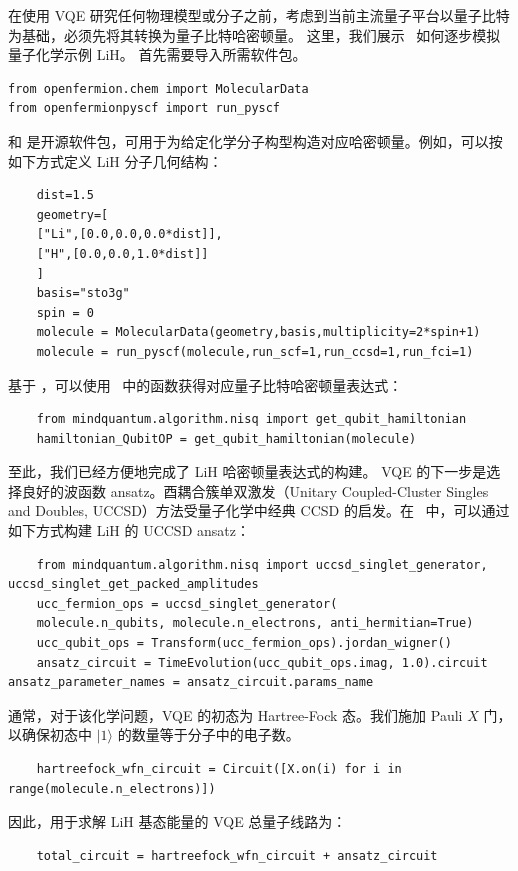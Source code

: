 在使用 VQE 研究任何物理模型或分子之前，考虑到当前主流量子平台以量子比特为基础，必须先将其转换为量子比特哈密顿量。
这里，我们展示 \MindQuantum\ 如何逐步模拟量子化学示例 LiH。
首先需要导入所需软件包。
\begin{lstlisting}
from openfermion.chem import MolecularData
from openfermionpyscf import run_pyscf
\end{lstlisting}
 和  是开源软件包，可用于为给定化学分子构型构造对应哈密顿量。例如，可以按如下方式定义 LiH 分子几何结构：
\begin{lstlisting}
    dist=1.5
    geometry=[
    ["Li",[0.0,0.0,0.0*dist]],
    ["H",[0.0,0.0,1.0*dist]]
    ]
    basis="sto3g"
    spin = 0
    molecule = MolecularData(geometry,basis,multiplicity=2*spin+1)
    molecule = run_pyscf(molecule,run_scf=1,run_ccsd=1,run_fci=1)
\end{lstlisting}
基于 ，可以使用 \MindQuantum\ 中的函数获得对应量子比特哈密顿量表达式：
\begin{lstlisting}
    from mindquantum.algorithm.nisq import get_qubit_hamiltonian
    hamiltonian_QubitOP = get_qubit_hamiltonian(molecule)
\end{lstlisting}
至此，我们已经方便地完成了 LiH 哈密顿量表达式的构建。
VQE 的下一步是选择良好的波函数 ansatz。酉耦合簇单双激发（Unitary Coupled-Cluster Singles and Doubles, UCCSD）方法受量子化学中经典 CCSD 的启发。在 \MindQuantum\ 中，可以通过如下方式构建 LiH 的 UCCSD ansatz：
\begin{lstlisting}
    from mindquantum.algorithm.nisq import uccsd_singlet_generator, uccsd_singlet_get_packed_amplitudes
    ucc_fermion_ops = uccsd_singlet_generator(
    molecule.n_qubits, molecule.n_electrons, anti_hermitian=True)
    ucc_qubit_ops = Transform(ucc_fermion_ops).jordan_wigner()
    ansatz_circuit = TimeEvolution(ucc_qubit_ops.imag, 1.0).circuit
ansatz_parameter_names = ansatz_circuit.params_name
\end{lstlisting}
通常，对于该化学问题，VQE 的初态为 Hartree-Fock 态。我们施加 Pauli $X$ 门，以确保初态中 $|1\rangle$ 的数量等于分子中的电子数。
\begin{lstlisting}
    hartreefock_wfn_circuit = Circuit([X.on(i) for i in range(molecule.n_electrons)])
\end{lstlisting}
因此，用于求解 LiH 基态能量的 VQE 总量子线路为：
\begin{lstlisting}
    total_circuit = hartreefock_wfn_circuit + ansatz_circuit
\end{lstlisting}

